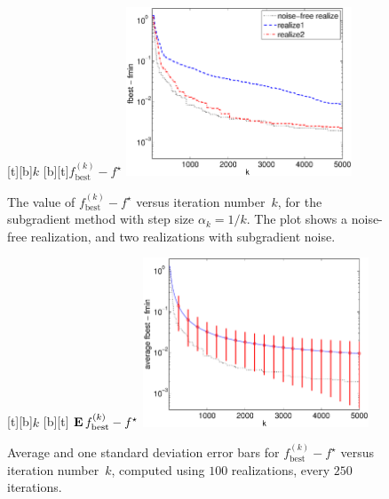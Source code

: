 \documentclass[12pt]{article}
\begin{document}
\begin{figure}
\begin{center}
[t][b]{$k$}
[b][t]{$f_\mathrm{best}^{(k)} - f^\star$}
\includegraphics[width=0.6\textwidth]{matlab/pwl_error_fbest_realize}
\end{center}
\caption{The value of $f_\mathrm{best}^{(k)} - f^\star$
versus iteration number~$k$,
for the subgradient method with step size
$\alpha_k=1/k$. The plot shows a noise-free realization,
and two realizations with subgradient noise.}
\label{f-pwl-error-fbest}
%
\begin{center}
[t][b]{$k$}
[b][t]
{$\mathop{\bf E{}} f_\mathrm{best}^{(k)} - f^\star$}
\includegraphics[width=0.6\textwidth]{matlab/pwl_error_fbest_average}
\end{center}
\caption{Average and one standard deviation error bars
for $f_\mathrm{best}^{(k)} - f^\star$ versus iteration number~$k$,
computed using $100$ realizations, every $250$ iterations.}
\label{f-pwl-error-fbest-avg}
\end{figure}
\end{document}
